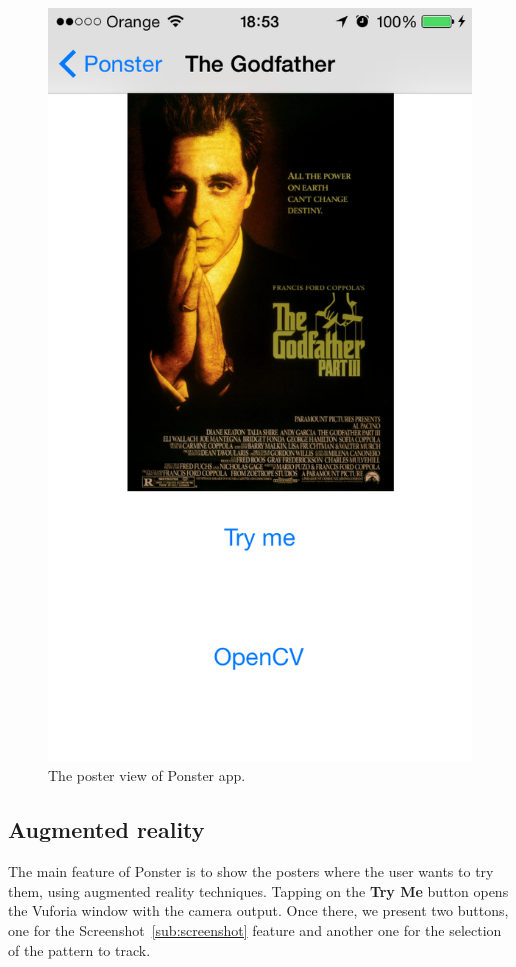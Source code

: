 \begin{figure}
\centering
\includegraphics[scale=0.55]{img/posterview.png}
\caption{\label{fig:posterview} The poster view of Ponster app.}
\end{figure} 

\subsection*{Augmented reality}
The main feature of Ponster is to show the posters where the user wants to try
them, using augmented reality techniques. Tapping on the \textbf{Try Me} button
opens the Vuforia window with the camera output. Once there, we present two
buttons, one for the Screenshot~\ref{sub:screenshot} feature and another one
for the selection of the pattern to track. 

